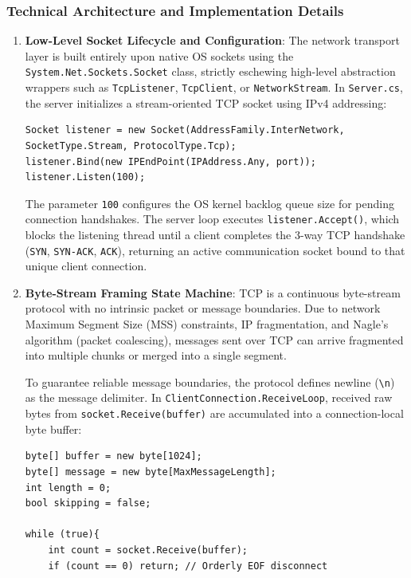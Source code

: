 \documentclass[11pt,a4paper]{article}
\begin{document}
\subsubsection{Technical Architecture and Implementation Details}
\begin{enumerate}
    \item \textbf{Low-Level Socket Lifecycle and Configuration}:
    The network transport layer is built entirely upon native OS sockets using the \texttt{System.Net.Sockets.Socket} class, strictly eschewing high-level abstraction wrappers such as \texttt{TcpListener}, \texttt{TcpClient}, or \texttt{NetworkStream}. In \texttt{Server.cs}, the server initializes a stream-oriented TCP socket using IPv4 addressing:
    \begin{lstlisting}[language={[Sharp]C}]
Socket listener = new Socket(AddressFamily.InterNetwork, SocketType.Stream, ProtocolType.Tcp);
listener.Bind(new IPEndPoint(IPAddress.Any, port));
listener.Listen(100);
    \end{lstlisting}
    The parameter \texttt{100} configures the OS kernel backlog queue size for pending connection handshakes. The server loop executes \texttt{listener.Accept()}, which blocks the listening thread until a client completes the 3-way TCP handshake (\texttt{SYN}, \texttt{SYN-ACK}, \texttt{ACK}), returning an active communication socket bound to that unique client connection.

    \item \textbf{Byte-Stream Framing State Machine}:
    TCP is a continuous byte-stream protocol with no intrinsic packet or message boundaries. Due to network Maximum Segment Size (MSS) constraints, IP fragmentation, and Nagle's algorithm (packet coalescing), messages sent over TCP can arrive fragmented into multiple chunks or merged into a single segment. 
    
    To guarantee reliable message boundaries, the protocol defines newline (\texttt{\textbackslash n}) as the message delimiter. In \texttt{ClientConnection.ReceiveLoop}, received raw bytes from \texttt{socket.Receive(buffer)} are accumulated into a connection-local byte buffer:
    \begin{lstlisting}[language={[Sharp]C}]
byte[] buffer = new byte[1024];
byte[] message = new byte[MaxMessageLength];
int length = 0;
bool skipping = false;

while (true){
    int count = socket.Receive(buffer);
    if (count == 0) return; // Orderly EOF disconnect


\end{lstlisting}
\end{enumerate}
\end{document}

